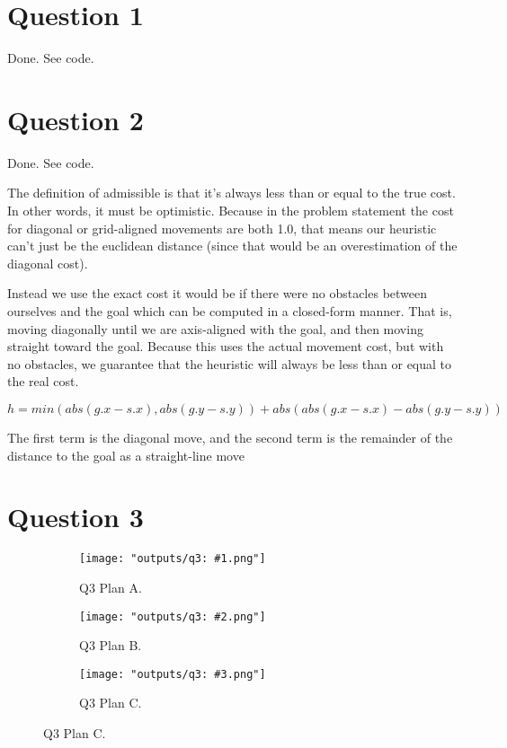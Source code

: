 \documentclass[11pt]{article}
\begin{document}
 
\singlespacing

\section{Question 1}
Done. See code.

\section{Question 2}
Done. See code. 

The definition of admissible is that it's always less than or equal to the true cost. In other words, it must be optimistic. Because in the problem statement the cost for diagonal or grid-aligned movements are both 1.0, that means our heuristic can't just be the euclidean distance (since that would be an overestimation of the diagonal cost).

Instead we use the exact cost it would be if there were no obstacles between ourselves and the goal which can be computed in a closed-form manner. That is, moving diagonally until we are axis-aligned with the goal, and then moving straight toward the goal. Because this uses the actual movement cost, but with no obstacles, we guarantee that the heuristic will always be less than or equal to the real cost.

\begin{equation}
	h = min(abs(g.x - s.x), abs(g.y - s.y)) + abs(abs(g.x - s.x) - abs(g.y - s.y))
\end{equation}

The first term is the diagonal move, and the second term is the remainder of the distance to the goal as a straight-line move

\section{Question 3}

\begin{figure}[H]
	\centering
    	\begin{subfigure}{0.33\textwidth}
    		\texttt{[image: "outputs/q3: \#1.png"]}
    		\caption{Q3  Plan A.}
	\end{subfigure}
    	\begin{subfigure}{0.33\textwidth}
    		\texttt{[image: "outputs/q3: \#2.png"]}
    		\caption{Q3  Plan B.}
	\end{subfigure}
    	\begin{subfigure}{0.33\textwidth}
    		\texttt{[image: "outputs/q3: \#3.png"]}
    		\caption{Q3  Plan C.}
	\end{subfigure}
	
\end{figure}
\end{document}
